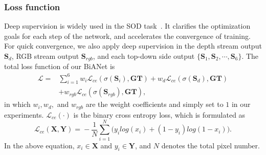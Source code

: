 \documentclass[journal]{IEEEtran}
\begin{document}
\subsubsection{Loss function}
Deep supervision is widely used in the SOD task~\cite{feng2019attentive,hou2019deeply}.
It clarifies the optimization goals for each step of the network, and accelerates the convergence of training.
For quick convergence,
we also apply deep supervision in the depth stream output $\mathbf{S}_{d}$, 
RGB stream output $\mathbf{S}_{rgb}$, and each top-down side output $\{\mathbf{S}_1,\mathbf{S}_2,\cdots,\mathbf{S}_6\}$.
The total loss function of our BiANet is
\begin{equation}
\begin{split}
\mathcal{L} = & \sum\nolimits_{i=1}^6w_i\mathcal{L}_{ce}\left(\sigma\left(\mathbf{S}_i\right), \mathbf{GT}\right) + w_d\mathcal{L}_{ce}\left(\sigma\left(\mathbf{S}_{d}\right), \mathbf{GT}\right) \\
&+w_{rgb}\mathcal{L}_{ce}\left(\sigma\left(\mathbf{S}_{rgb}\right), \mathbf{GT}\right),
\end{split}
\end{equation}
in which $w_i, w_d,$ and $w_{rgb}$ are the weight coefficients
and simply set to $1$ in our experiments. $\mathcal{L}_{ce}(\cdot)$ is the binary cross entropy loss, which is formulated as
\begin{equation}
\mathcal{L}_{ce}(\mathbf{X}, \mathbf{Y})\!=\! -\frac{1}{N} \sum\limits_{i=1}^N\Big(y_{i}log(x_{i}) + (1 - y_{i})log(1-x_{i})\Big).
\end{equation}
In the above equation, $x_i\in \mathbf{X}$ and $y_i\in \mathbf{Y}$, and $N$ denotes the total pixel number.  
\end{document}
